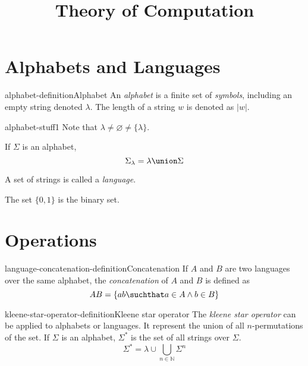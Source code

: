 \documentclass[preview]{standalone}
\newcommand{\emptyString}{\lambda}
\begin{document}
\title{Theory of Computation}
\genpage

\section{Alphabets and Languages}

\begin{snippetdefinition}{alphabet-definition}{Alphabet}
    An \textit{alphabet} is a finite set of \textit{symbols},
    including an empty string denoted \(\emptyString\).
    The length of a string \(w\) is denoted as \(|w|\).
\end{snippetdefinition}

\begin{snippet}{alphabet-stuff1}
    Note that \(\emptyString \neq \varnothing \neq \{\emptyString\}\).

    If \(\Sigma\) is an alphabet,
    \[
        \Sigma_\emptyString = \emptyString \union \Sigma
    \]

    A set of strings is called a \textit{language}.

    The set \(\{0,1\}\) is the binary set.
\end{snippet}

\section{Operations}

\begin{snippetdefinition}{language-concatenation-definition}{Concatenation}
    If \(A\) and \(B\) are two languages over the same alphabet,
    the \textit{concatenation} of \(A\) and \(B\) is defined as
    \[
        AB = \{ab \suchthat a \in A \land b \in B\}
    \]
\end{snippetdefinition}

\begin{snippetdefinition}{kleene-star-operator-definition}{Kleene star operator}
    The \textit{kleene star operator} can be applied to alphabets or languages.
    It represent the union of all \(n\)-permutations of the set.
    If \(\Sigma\) is an alphabet, \(\Sigma^*\) is the set of all strings over \(\Sigma\).
    \[
        \Sigma^* = \emptyString \cup \bigcup_{n\in\mathbb{N}} \Sigma^n
    \]
\end{snippetdefinition}

\end{document}
